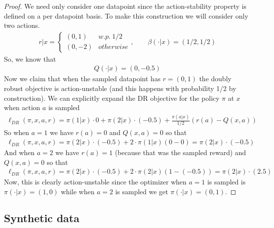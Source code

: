 \begin{proof}
We need only consider one datapoint since the action-stability property is defined on a per datapoint basis. To make this construction we will consider only two actions.
\begin{align}
    r|x = \begin{cases} (0, 1) & w.p.\ 1/2\\ (0, -2) & otherwise\end{cases}, \qquad \beta(\cdot|x) = (1/2, 1/2)
\end{align}
So, we know that
\begin{align}
    Q(\cdot|x) = (0,-0.5)
\end{align}
Now we claim that when the sampled datapoint has $ r = (0,1)$ the doubly robust objective is action-unstable (and this happens with probability 1/2 by construction).
We can explicitly expand the DR objective for the policy $ \pi$ at $ x $ when action $ a $ is sampled
\begin{align}
    \ell_{DR}(\pi, x, a, r) = \pi(1|x) \cdot 0 + \pi(2|x) \cdot (-0.5) + \frac{\pi(a|x)}{1/2}(r(a) - Q(x,a))
\end{align}
So when $a = 1$ we have $ r(a) = 0$ and $ Q(x,a) = 0$ so that
\begin{align}
    \ell_{DR}(\pi, x, a, r) = \pi(2|x) \cdot (-0.5) + 2 \cdot \pi(1|x)(0 - 0) = \pi(2|x) \cdot (-0.5)
\end{align}
And when $ a=2$ we have $ r(a) = 1$ (because that was the sampled reward) and $ Q(x,a) = 0$ so that
\begin{align}
    \ell_{DR}(\pi, x, a, r) = \pi(2|x) \cdot (-0.5)  + 2 \cdot \pi(2|x) (1 - (-0.5)) = \pi(2|x) \cdot (2.5)
\end{align}
Now, this is clearly action-unstable since the optimizer when $ a=1 $ is sampled is $ \pi(\cdot|x) = (1,0)$ while when $ a = 2$ is sampled we get $ \pi(\cdot|x) = (0,1)$.
\end{proof}





\label{app:experiments}

\subsection{Synthetic data}

